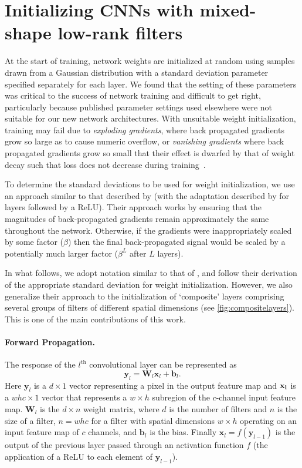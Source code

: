 \documentclass[thesis]{subfiles}
\begin{document}
    \section{Initializing CNNs with mixed-shape low-rank filters}\label{initializationderivation}
    At the start of training, network weights are initialized at random using samples drawn from a Gaussian distribution with a standard deviation parameter specified separately for each layer. We found that the setting of these parameters was critical to the success of network training and difficult to get right, particularly because published parameter settings used elsewhere were not suitable for our new network architectures. With unsuitable weight initialization, training may fail due to {\em exploding gradients}, where  back propagated gradients grow so large as to cause numeric overflow, or {\em vanishing gradients} where back propagated gradients grow so small that their effect is dwarfed by that of weight decay such that loss does not decrease during training~\citep{Hochreiter01gradientflow}.
    
    To determine the standard deviations to be used for weight initialization, we use an approach similar to that described by \citet{glorot2010understanding} (with the adaptation described by \citet{He2015b} for layers followed by a ReLU). Their approach works by ensuring that the magnitudes of back-propagated gradients remain approximately the same throughout the network. Otherwise, if the gradients were inappropriately scaled by some factor (\eg $\beta$) then the final back-propagated signal would be scaled by a potentially much larger factor ($\beta^L$ after $L$ layers).
    
    In what follows, we adopt notation similar to that of \citet{He2015b}, and follow their derivation of the appropriate standard deviation for weight initialization. However, we also generalize their approach to the initialization of `composite' layers comprising several groups of filters of different spatial dimensions (see \cref{fig:compositelayers}). This is one of the main contributions of this work.
    
    \paragraph{Forward Propagation.}
    The response of the $l^\text{th}$ convolutional layer can be represented as
    \begin{equation}
    \mathbf{y}_l =\mathbf{W}_l \mathbf{x}_l + \mathbf{b}_l.
    \end{equation}
    Here $\mathbf{y}_l$ is a $d \times 1$ vector representing a pixel in the output feature map and $\bf x_l$ is a $ w h c \times 1$ vector that represents a $w \times h$ subregion of the $c$-channel input feature map. $\mathbf{W}_l$ is the $d\times n$ weight matrix, where $d$ is the number of filters and $n$ is the size of a filter, \ie $n = w h c$ for a filter with spatial dimensions $w \times h$ operating on an input feature map of $c$ channels, and $\mathbf{b}_l$ is the bias. Finally $\mathbf{x}_l = f(\mathbf{y}_{l-1})$ is the output of the previous layer passed through an activation function $f$ (\eg the application of a ReLU to each element of $\mathbf{y}_{l-1}$).
    
\end{document}
